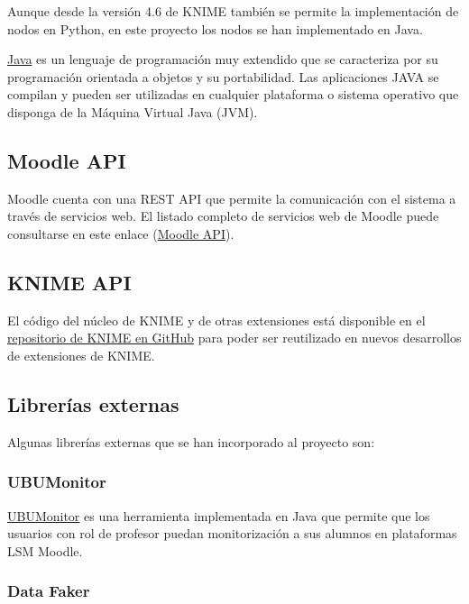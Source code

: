 Aunque desde la versión 4.6 de KNIME también se permite la implementación de nodos en Python, en este proyecto los nodos se 
han implementado en Java. 
\

\href{https://www.java.com/}{Java} es un lenguaje de programación muy extendido que se caracteriza por su programación orientada a objetos y su portabilidad. Las 
aplicaciones JAVA se compilan y pueden ser utilizadas en cualquier plataforma o sistema operativo que disponga de la Máquina 
Virtual Java (JVM).

\subsection{Moodle API}

Moodle cuenta con una REST API que permite la comunicación con el sistema a través de servicios web. El listado completo de servicios
web de Moodle puede consultarse en este enlace (\href{https://docs.moodle.org/dev/Web_service_API_functions}{Moodle API}). 


\subsection{KNIME API}

El código del núcleo de KNIME y de otras extensiones está disponible en el \href{https://github.com/knime/}{repositorio de KNIME en GitHub} para poder ser reutilizado en nuevos desarrollos de extensiones
de KNIME. 

\subsection{Librerías externas}

Algunas librerías externas que se han incorporado al proyecto son: 

\subsubsection{UBUMonitor}

\href{https://github.com/yjx0003/UBUMonitor}{UBUMonitor} es una herramienta implementada en Java que permite que los usuarios con 
rol de profesor puedan monitorización a sus alumnos en plataformas LSM Moodle. 

\subsubsection{Data Faker}

